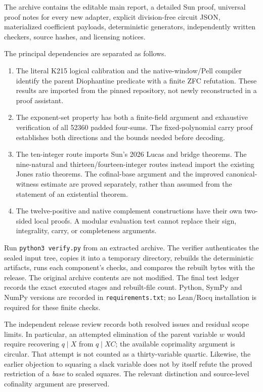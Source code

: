 The archive contains the editable main report, a detailed Sun proof, universal proof notes for every new adapter, explicit division-free circuit JSON, materialized coefficient payloads, deterministic generators, independently written checkers, source hashes, and licensing notices.

The principal dependencies are separated as follows.
\begin{enumerate}
\item The literal K215 logical calibration and the native-window/Pell compiler identify the parent Diophantine predicate with a finite ZFC refutation. These results are imported from the pinned repository, not newly reconstructed in a proof assistant.
\item The exponent-set property has both a finite-field argument and exhaustive verification of all 52360 padded four-sums. The fixed-polynomial carry proof establishes both directions and the bounds needed before decoding.
\item The ten-integer route imports Sun's 2026 Lucas and bridge theorems. The nine-natural and thirteen/fourteen-integer routes instead import the existing Jones ratio theorems. The cofinal-base argument and the improved canonical-witness estimate are proved separately, rather than assumed from the statement of an existential theorem.
\item The twelve-positive and native complement constructions have their own two-sided local proofs. A modular evaluation test cannot replace their sign, integrality, carry, or completeness arguments.
\end{enumerate}
Run \texttt{python3 verify.py} from an extracted archive. The verifier authenticates the sealed input tree, copies it into a temporary directory, rebuilds the deterministic artifacts, runs each component's checks, and compares the rebuilt bytes with the release. The original archive contents are not modified. The final test ledger records the exact executed stages and rebuilt-file count. Python, SymPy and NumPy versions are recorded in \texttt{requirements.txt}; no Lean/Rocq installation is required for these finite checks.

The independent release review records both resolved issues and residual scope limits. In particular, an attempted elimination of the parent variable $w$ would require recovering $q\mid X$ from $q\mid XC$; the available coprimality argument is circular. That attempt is not counted as a thirty-variable quartic. Likewise, the earlier objection to squaring a slack variable does not by itself refute the proved restriction of a \emph{base} to scaled squares. The relevant distinction and source-level cofinality argument are preserved.


